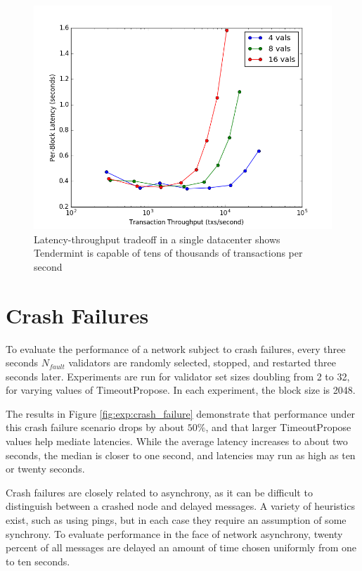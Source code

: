 \begin{figure}[]
	\includegraphics[width=\linewidth,height=\textheight,keepaspectratio]{figures/throughput/single_datacenter/latency-throughput.png}
    	\centering
	\caption[Latency-throughput in non-faulty network, single data center]{Latency-throughput tradeoff in a single datacenter shows Tendermint is capable of tens of thousands of transactions per second}
	\label{fig:exp:single}
\end{figure}

\section{Crash Failures}

To evaluate the performance of a network subject to crash failures, every three seconds $N_{fault}$ validators are randomly selected,
stopped, and restarted three seconds later.
Experiments are run for validator set sizes doubling from 2 to 32, for varying values of TimeoutPropose.
In each experiment, the block size is 2048.

The results in Figure \ref{fig:exp:crash_failure} demonstrate that performance under this crash failure scenario drops by about 
$50\%$, and that larger TimeoutPropose values help mediate latencies. While the average latency increases to about two seconds,
the median is closer to one second, and latencies may run as high as ten or twenty seconds.


\ifx
Crash failures are closely related to asynchrony, as it can be difficult to distinguish between a crashed node
and delayed messages. A variety of heuristics exist, such as using pings, 
but in each case they require an assumption of some synchrony. 
To evaluate performance in the face of network asynchrony, twenty percent of all messages are delayed an amount of time chosen uniformly 
from one to ten seconds.
\fi


